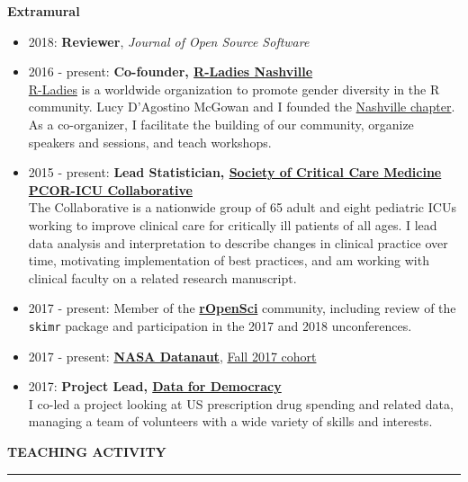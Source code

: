\documentclass[5pt]{article}
\begin{document}
\noindent \textbf{Extramural}
\begin{itemize}
\item 2018: \textbf{Reviewer}, \emph{Journal of Open Source Software}
\item 2016 - present: \textbf{Co-founder, \href{https://www.meetup.com/rladies-nashville}{R-Ladies Nashville}}\\
\indent \href{http://www.rladies.org}{R-Ladies} is a worldwide organization to promote gender diversity in the R community. Lucy D'Agostino McGowan and I founded the \href{https://www.meetup.com/rladies-nashville}{Nashville chapter}.  As a co-organizer, I facilitate the building of our community, organize speakers and sessions, and teach workshops.
\item 2015 - present: \textbf{Lead Statistician, \href{www.iculiberation.org}{Society of Critical Care Medicine PCOR-ICU Collaborative}}\\
\indent The Collaborative is a nationwide group of 65 adult and eight pediatric ICUs working to improve clinical care for critically ill patients of all ages. I lead data analysis and interpretation to describe changes in clinical practice over time, motivating implementation of best practices, and am working with clinical faculty on a related research manuscript.
\item 2017 - present: Member of the  \textbf{\href{https://ropensci.org}{rOpenSci}} community, including review of the \texttt{skimr} package and participation in the 2017 and 2018 unconferences.
\item 2017 - present: \textbf{\href{https://open.nasa.gov/explore/datanauts/}{NASA Datanaut}}, \href{https://open.nasa.gov/explore/datanauts/2017/fall/}{Fall 2017 cohort}
\item 2017: \textbf{Project Lead, \href{http://datafordemocracy.org}{Data for Democracy}}\\ I co-led a project looking at US prescription drug spending and related data, managing a team of volunteers with a wide variety of skills and interests.
\end{itemize}

\clearpage
\noindent \linebreak \textbf{TEACHING ACTIVITY}\\
\rule[5pt]{\linewidth}{1.0pt}
\end{document}
